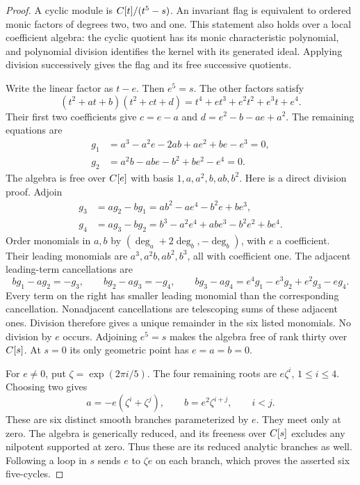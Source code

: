 \begin{proof}
A cyclic module is $C[t]/(t^5-s)$. An invariant flag is equivalent
to ordered monic factors of degrees two, two and one. This statement
also holds over a local coefficient algebra: the cyclic quotient
has its monic characteristic polynomial, and polynomial division
identifies the kernel with its generated ideal. Applying division
successively gives the flag and its free successive quotients.

Write the linear factor as $t-e$. Then $e^5=s$. The other factors
satisfy
\[
 (t^2+at+b)(t^2+ct+d)=t^4+et^3+e^2t^2+e^3t+e^4.
\]
Their first two coefficients give
$c=e-a$ and $d=e^2-b-ae+a^2$. The remaining equations are
\[
\begin{split}
 g_1&=a^3-a^2e-2ab+ae^2+be-e^3=0,\\
 g_2&=a^2b-abe-b^2+be^2-e^4=0.
\end{split}
\]
The algebra is free over $C[e]$ with basis
$1,a,a^2,b,ab,b^2$. Here is a direct division proof.
Adjoin
\[
\begin{split}
 g_3&=ag_2-bg_1=ab^2-ae^4-b^2e+be^3,\\
 g_4&=ag_3-bg_2=b^3-a^2e^4+abe^3-b^2e^2+be^4.
\end{split}
\]
Order monomials in $a,b$ by $(\deg_a+2\deg_b,-\deg_b)$,
with $e$ a coefficient. Their leading monomials are
$a^3,a^2b,ab^2,b^3$, all with coefficient one.
The adjacent leading-term cancellations are
\[
 bg_1-ag_2=-g_3,\qquad bg_2-ag_3=-g_4,\qquad
 bg_3-ag_4=e^4g_1-e^3g_2+e^2g_3-eg_4.
\]
Every term on the right has smaller leading monomial than the
corresponding cancellation. Nonadjacent cancellations are telescoping
sums of these adjacent ones. Division therefore gives a unique
remainder in the six listed monomials. No division by $e$ occurs.
Adjoining $e^5=s$ makes the algebra free of rank thirty over $C[s]$.
At $s=0$ its only geometric point has $e=a=b=0$.

For $e\ne0$, put $\zeta=\exp(2\pi i/5)$. The four remaining roots
are $e\zeta^i$, $1\le i\le4$. Choosing two gives
\[
 a=-e(\zeta^i+\zeta^j),\qquad b=e^2\zeta^{i+j},\qquad i<j.
\]
These are six distinct smooth branches parameterized by $e$.
They meet only at zero. The algebra is generically reduced, and
its freeness over $C[s]$ excludes any nilpotent supported at zero.
Thus these are its reduced analytic branches as well.
Following a loop in $s$ sends $e$ to $\zeta e$ on each branch,
which proves the asserted six five-cycles.
\end{proof}

